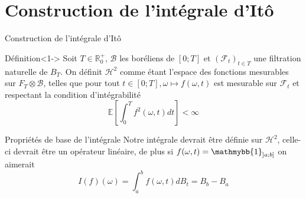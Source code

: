 \documentclass{beamer}
\newcommand{\1}{\mathmybb{1}}
\begin{document}
 \section{Construction de l'intégrale d'Itô}
 \begin{frame}{Construction de l'intégrale d'Itô}
   \begin{block}{Définition}<1->
     Soit $T \in \mathbb{R}^{+}_{0}$, $\mathcal{B}$ les boréliens de $\left[0; T  \right]$ et $\left( \mathcal{F}_{t} \right)_{t\in T}$ une filtration naturelle de $B_{T}$.
     On définit $\mathcal{H}^{2}$ comme étant l'espace des fonctions mesurables sur $F_{T} \otimes \mathcal{B}$, telles que pour tout $ t \in \left[0; T  \right], \omega \mapsto f(\omega, t)$ est mesurable sur $\mathcal{F}_{t}$ et respectant la condition d'intégrabilité \\
     \[
       \mathbb{E}\left[\int_{0}^{T}f^{2}(\omega, t) dt \right] < \infty
     \]
   \end{block}
   \begin{block}{Propriétés de base de l'intégrale}
     Notre intégrale devrait être définie sur $\mathcal{H}^{2}$, celle-ci devrait être un opérateur linéaire, de plus
si $ f(\omega, t) = \1_{\left] a; b \right]} $ on aimerait
     \[
       I(f)(\omega) = \int_{a}^{b}f(\omega, t) dB_{t} = B_{b} - B_{a}
     \]
   \end{block}
 \end{frame}
 
\end{document}

